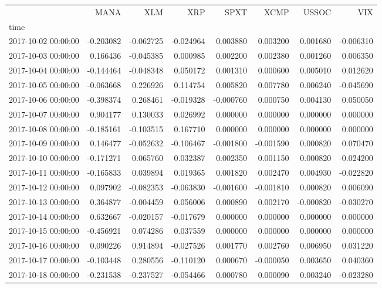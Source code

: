 \begin{tabular}{lrrrrrrr}
\toprule
 & MANA & XLM & XRP & SPXT & XCMP & USSOC & VIX \\
time &  &  &  &  &  &  &  \\
\midrule
2017-10-02 00:00:00 & -0.203082 & -0.062725 & -0.024964 & 0.003880 & 0.003200 & 0.001680 & -0.006310 \\
2017-10-03 00:00:00 & 0.166436 & -0.045385 & 0.000985 & 0.002200 & 0.002380 & 0.001260 & 0.006350 \\
2017-10-04 00:00:00 & -0.144464 & -0.048348 & 0.050172 & 0.001310 & 0.000600 & 0.005010 & 0.012620 \\
2017-10-05 00:00:00 & -0.063668 & 0.226926 & 0.114754 & 0.005820 & 0.007780 & 0.006240 & -0.045690 \\
2017-10-06 00:00:00 & -0.398374 & 0.268461 & -0.019328 & -0.000760 & 0.000750 & 0.004130 & 0.050050 \\
2017-10-07 00:00:00 & 0.904177 & 0.130033 & 0.026992 & 0.000000 & 0.000000 & 0.000000 & 0.000000 \\
2017-10-08 00:00:00 & -0.185161 & -0.103515 & 0.167710 & 0.000000 & 0.000000 & 0.000000 & 0.000000 \\
2017-10-09 00:00:00 & 0.146477 & -0.052632 & -0.106467 & -0.001800 & -0.001590 & 0.000820 & 0.070470 \\
2017-10-10 00:00:00 & -0.171271 & 0.065760 & 0.032387 & 0.002350 & 0.001150 & 0.000820 & -0.024200 \\
2017-10-11 00:00:00 & -0.165833 & 0.039894 & 0.019365 & 0.001820 & 0.002470 & 0.004930 & -0.022820 \\
2017-10-12 00:00:00 & 0.097902 & -0.082353 & -0.063830 & -0.001600 & -0.001810 & 0.000820 & 0.006090 \\
2017-10-13 00:00:00 & 0.364877 & -0.004459 & 0.056006 & 0.000890 & 0.002170 & -0.000820 & -0.030270 \\
2017-10-14 00:00:00 & 0.632667 & -0.020157 & -0.017679 & 0.000000 & 0.000000 & 0.000000 & 0.000000 \\
2017-10-15 00:00:00 & -0.456921 & 0.074286 & 0.037559 & 0.000000 & 0.000000 & 0.000000 & 0.000000 \\
2017-10-16 00:00:00 & 0.090226 & 0.914894 & -0.027526 & 0.001770 & 0.002760 & 0.006950 & 0.031220 \\
2017-10-17 00:00:00 & -0.103448 & 0.280556 & -0.110120 & 0.000670 & -0.000050 & 0.003650 & 0.040360 \\
2017-10-18 00:00:00 & -0.231538 & -0.237527 & -0.054466 & 0.000780 & 0.000090 & 0.003240 & -0.023280 \\

\end{tabular}
